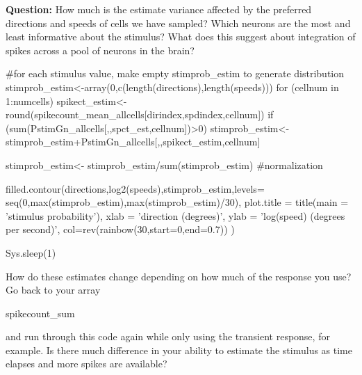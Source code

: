 \documentclass[
letterpaper, %
11pt, %
 oneside, 
onecolumn, %
]{memoir}
\numberwithin{Exercise}{chapter}
\begin{document}
\textbf{Question: } How much is the estimate variance affected by the preferred directions and speeds of cells we have sampled?  Which neurons are the most and least informative about the stimulus?  What does this suggest about integration of spikes across a pool of neurons in the brain?

\begin{shortrcode}

#for each stimulus value, make empty stimprob_estim to generate distribution
    stimprob_estim<-array(0,c(length(directions),length(speeds)))
       for (cellnum in 1:numcells){
         spikect_estim<-round(spikecount_mean_allcells[dirindex,spdindex,cellnum])
         if (sum(PstimGn_allcells[,,spct_est,cellnum])>0){
           stimprob_estim<-stimprob_estim+PstimGn_allcells[,,spikect_estim,cellnum]
          }
        }
      
stimprob_estim<- stimprob_estim/sum(stimprob_estim) #normalization

filled.contour(directions,log2(speeds),stimprob_estim,levels=
				seq(0,max(stimprob_estim),max(stimprob_estim)/30),
                     plot.title = title(main = 'stimulus probability'),
                     xlab =  'direction (degrees)',
                     ylab = 'log(speed) (degrees per second)',
                     col=rev(rainbow(30,start=0,end=0.7))
      )

  Sys.sleep(1)

\end{shortrcode}

How do these estimates change depending on how much of the response you use? 
Go back to your array \begin{ttfamily}spikecount\_sum\end{ttfamily} and run through this code again while only using the transient response, for example. Is there much difference in your ability to estimate the stimulus 
as time elapses and more spikes are available?
\end{document}

